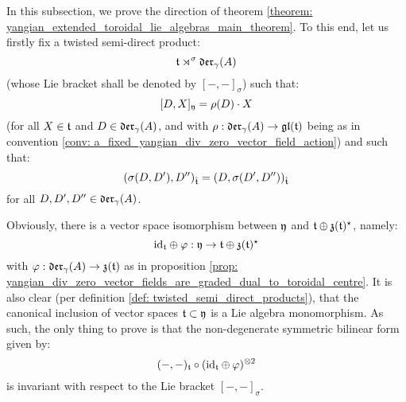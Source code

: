         In this subsection, we prove the  direction of theorem \ref{theorem: yangian_extended_toroidal_lie_algebras_main_theorem}. To this end, let us firstly fix a twisted semi-direct product:
            $$\mathfrak{t} \rtimes^{\sigma} \mathfrak{der}_{\gamma}(A)$$
        (whose Lie bracket shall be denoted by $[-, -]_{\sigma}$) such that:
            $$[D, X]_{\mathfrak{y}} = \rho(D) \cdot X$$
        (for all $X \in \mathfrak{t}$ and $D \in \mathfrak{der}_{\gamma}(A)$, and with $\rho: \mathfrak{der}_{\gamma}(A) \to \mathfrak{gl}(\mathfrak{t})$ being as in convention \ref{conv: a_fixed_yangian_div_zero_vector_field_action}) and such that:
            $$(\sigma(D, D'), D'')_{\hat{\mathfrak{t}}} = (D, \sigma(D', D''))_{\hat{\mathfrak{t}}}$$
        for all $D, D', D'' \in \mathfrak{der}_{\gamma}(A)$.

        \begin{remark}
            Obviously, there is a vector space isomorphism between $\mathfrak{y}$ and $\mathfrak{t} \oplus \mathfrak{z}(\mathfrak{t})^{\star}$, namely:
                $$\mathrm{id}_{\mathfrak{t}} \oplus \varphi: \mathfrak{y} \to \mathfrak{t} \oplus \mathfrak{z}(\mathfrak{t})^{\star}$$
            with $\varphi: \mathfrak{der}_{\gamma}(A) \to \mathfrak{z}(\mathfrak{t})$ as in proposition \ref{prop: yangian_div_zero_vector_fields_are_graded_dual_to_toroidal_centre}. It is also clear (per definition \ref{def: twisted_semi_direct_products}), that the canonical inclusion of vector spaces $\mathfrak{t} \subset \mathfrak{y}$ is a Lie algebra monomorphism. As such, the only thing to prove is that the non-degenerate symmetric bilinear form given by:
                $$(-, -)_{\toroidal} \circ (\id_{\toroidal} \oplus \varphi)^{\tensor 2}$$
            is invariant with respect to the Lie bracket $[-, -]_{\sigma}$.
        \end{remark}

